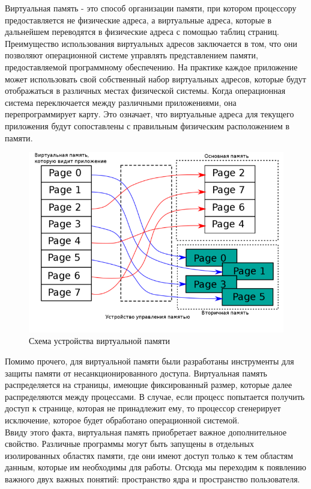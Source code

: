 Виртуальная память - это способ организации памяти, при котором процессору предоставляется не физические адреса, а виртуальные адреса, которые в дальнейшем переводятся в физические адреса с помощью таблиц страниц.
\\
Преимущество использования виртуальных адресов заключается в том,
что они позволяют операционной системе управлять представлением памяти,
предоставляемой программному обеспечению.
На практике каждое приложение может использовать свой собственный набор виртуальных адресов,
которые будут отображаться в различных местах физической системы.
Когда операционная система переключается между различными приложениями, она перепрограммирует карту.
Это означает, что виртуальные адреса для текущего приложения будут сопоставлены с правильным физическим расположением в памяти\cite{arm-virt}.\\

\begin{figure}[h]
    \centering
    \includegraphics[width=\textwidth]{inc/img/virt_mem}
    \caption{Схема устройства виртуальной памяти}
    \label{fig:virt_mem}
\end{figure}

\newpage

Помимо прочего, для виртуальной памяти были разработаны инструменты для защиты памяти от несанкционированного доступа.
Виртуальная память распределяется на страницы, имеющие фиксированный размер, которые далее распределяются между процессами.
В случае, если процесс попытается получить доступ к странице, которая не принадлежит ему, то процессор сгенерирует исключение, которое будет обработано операционной системой.
\\
Ввиду этого факта, виртуальная память приобретает важное дополнительное свойство.
Различные программы могут быть запущены в отдельных изолированных областях памяти, где они имеют доступ только к тем областям данным,
которые им необходимы для работы.
Отсюда мы переходим к появлению важного двух важных понятий: пространство ядра и пространство пользователя.
\newpage
